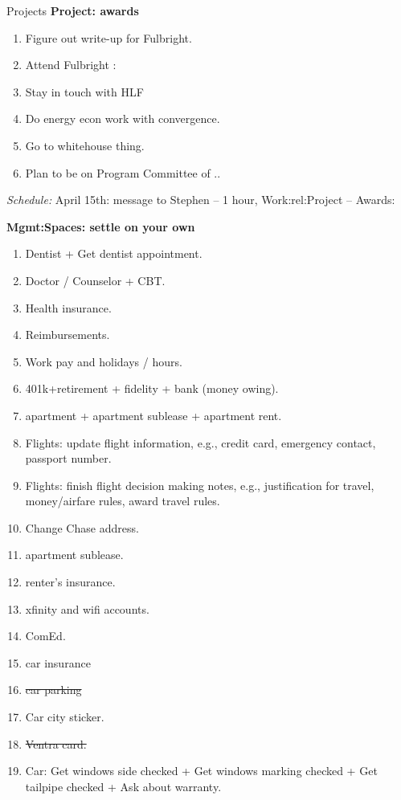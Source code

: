 \documentclass[serif, mathserif, final]{beamer}
\newcommand{\doneTask}[1]{\tiny \item \tiny \sout{#1}}
\begin{document}
\begin{frame}
\begin{columns}
\begin{block}{Projects}
{\bf Project: awards}
\begin{enumerate} 
\tiny \item \tiny Figure out write-up for Fulbright. 
\item \tiny Attend Fulbright : 
\item \tiny Stay in touch with HLF 
\item \tiny Do energy econ work with convergence. 
\item \tiny Go to whitehouse thing. 
\item \tiny Plan to be on Program Committee of .. 
\end{enumerate} 
\textit{Schedule:} April 15th: message to Stephen – 1 hour,
Work:rel:Project – Awards: 

{\bf Mgmt:Spaces: settle on your own} 
\begin{enumerate}
\tiny \item \tiny Dentist + Get dentist appointment.
\item \tiny Doctor / Counselor + CBT.
\item \tiny Health insurance.
\item \tiny Reimbursements.
\item \tiny Work pay and holidays / hours. 
\item \tiny 401k+retirement  + fidelity + bank (money owing). 
\item \tiny apartment + apartment sublease + apartment rent.
\item \tiny Flights: update flight information, e.g., credit card,
  emergency contact, passport number.
\item \tiny Flights: finish flight decision making notes, e.g.,
  justification for travel, money/airfare rules, award travel rules.
\item \tiny Change Chase address. 
\item \tiny apartment sublease. 
\item \tiny renter's insurance. 
\item \tiny xfinity and wifi accounts. 
\item \tiny ComEd. 
\item \tiny car insurance 
\doneTask{car parking} 
\item \tiny Car city sticker. 
\doneTask{Ventra card.}
\item \tiny Car: Get windows side checked + Get windows marking checked + Get tailpipe checked + Ask about warranty. 
\end{enumerate} 


\end{block}
\end{columns}
\end{frame}
\end{document}

